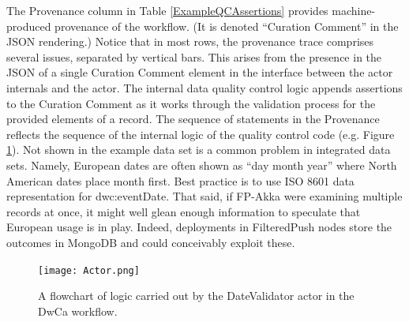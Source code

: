 \documentclass{article}
\begin{document}
The Provenance column in Table \ref{ExampleQCAssertions} provides machine-produced provenance of the workflow. (It is denoted ``Curation Comment'' in the JSON rendering.) 
 Notice that in most rows, the provenance trace comprises several issues, separated by vertical bars.  This arises from the presence in the JSON of a single Curation Comment element in the interface between the actor internals and the actor.  The internal data quality control logic appends assertions to the Curation Comment as it works through the validation process for the provided elements of a record. 
The sequence of statements in the Provenance reflects the sequence of the internal logic of the quality control code (e.g. Figure \ref{fig:actorlogic}).
Not shown in the example data set is a common problem in integrated data sets. Namely, European dates are often shown as ``day month year'' where North American dates place month first. Best practice is to use ISO 8601 data representation \citep{iso_iso_2004} for dwc:eventDate. 
That said, if FP-Akka were examining multiple records at once, it might well glean enough information to speculate that European usage is in play.  Indeed, deployments in FilteredPush nodes store the outcomes in MongoDB  and could conceivably exploit these.  

\begin{figure}[p]
\texttt{[image: Actor.png]}
\caption{A flowchart of logic carried out by the DateValidator actor in the DwCa workflow.}
\label{fig:actorlogic}
\end{figure}
\end{document}
